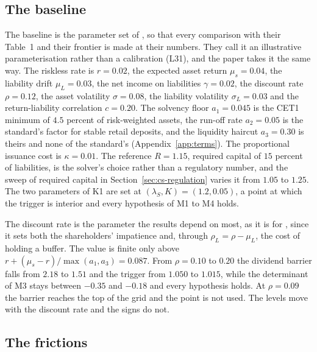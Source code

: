 \subsection{The baseline}
\label{sec:cs-baseline}

The baseline is the parameter set of \citet{bayraktar2026}, so that every
comparison with their Table~1 and their frontier is made at their numbers. They
call it an illustrative parameterisation rather than a calibration (L31), and
the paper takes it the same way. The riskless rate is $r=0.02$, the expected
asset return $\mu_s=0.04$, the liability drift $\mu_L=0.03$, the net income on
liabilities $\gamma=0.02$, the discount rate $\rho=0.12$, the asset volatility
$\sigma=0.08$, the liability volatility $\sigma_L=0.03$ and the
return-liability correlation $c=0.20$. The solvency floor $a_1=0.045$ is the
CET1 minimum of $4.5$ percent of risk-weighted assets, the run-off rate
$a_2=0.05$ is the standard's factor for stable retail deposits, and the
liquidity haircut $a_3=0.30$ is theirs and none of the standard's
(Appendix~\ref{app:terms}). The proportional issuance cost is $\kappa=0.01$.
The reference $R=1.15$, required capital of $15$ percent of liabilities, is the
solver's choice rather than a regulatory number, and the sweep of required capital in
Section~\ref{sec:cs-regulation} varies it from $1.05$ to $1.25$. The two
parameters of K1 are set at $(\lambda_S,K)=(1.2,0.05)$, a point at which the
trigger is interior and every hypothesis of M1 to M4 holds.

The discount rate is the parameter the results depend on most, as it is for
\citet{milnewhalley2001}, since it sets both the shareholders' impatience and,
through $\rho_L=\rho-\mu_L$, the cost of holding a buffer. The value is finite
only above $r+(\mu_s-r)/\max(a_1,a_3)=0.087$. From $\rho=0.10$ to $0.20$ the
dividend barrier falls from $2.18$ to $1.51$ and the trigger from $1.050$ to
$1.015$, while the determinant of M3 stays between $-0.35$ and $-0.18$ and
every hypothesis holds. At $\rho=0.09$ the barrier reaches the top of the grid
and the point is not used. The levels move with the discount rate and the
signs do not.

\subsection{The frictions}
\label{sec:cs-frictions}

